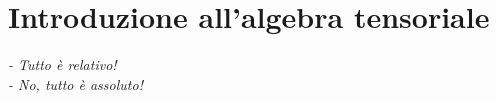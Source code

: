 \chapter{Introduzione all'algebra tensoriale}
\vspace{-1.0cm}
\begin{flushright}
\textit{
- Tutto è relativo! \\
- No, tutto è assoluto!
}
\end{flushright}
\vspace{+1.0cm}
\minitoc
\newpage



% 
% 
% 
% 
% 
% 
% 
% 
% 
% 
% 
% 




